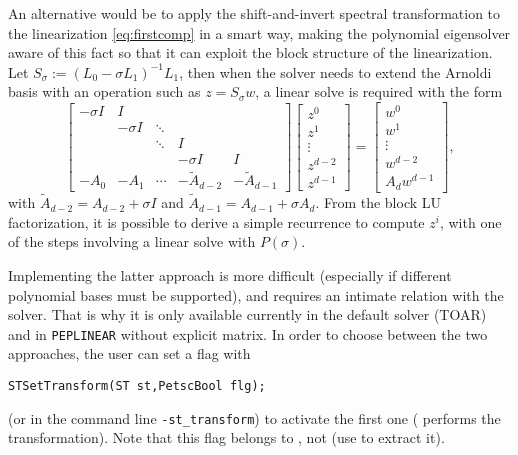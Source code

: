 An alternative would be to apply the shift-and-invert spectral transformation to the linearization \eqref{eq:firstcomp} in a smart way, making the polynomial eigensolver aware of this fact so that it can exploit the block structure of the linearization.
Let $S_\sigma:=(L_0-\sigma L_1)^{-1}L_1$, then when the solver needs to extend the Arnoldi basis with an operation such as $z=S_\sigma w$, a linear solve is required with the form
\begin{equation}
\label{eq:sinvpeplin}
\begin{bmatrix}
  -\sigma I  & I \\
  & -\sigma I & \ddots \\
  & & \ddots & I \\
  & & & -\sigma I & I \\
  -A_0 & -A_1 & \cdots  & -\tilde{A}_{d-2} & -\tilde{A}_{d-1}
\end{bmatrix}
\begin{bmatrix}
  z^0\\z^1\\\vdots\\z^{d-2}\\z^{d-1}
\end{bmatrix}
  =
\begin{bmatrix}
  w^0\\w^1\\\vdots\\w^{d-2}\\A_dw^{d-1}
\end{bmatrix},
\end{equation}
with $\tilde{A}_{d-2}=A_{d-2}+\sigma I$ and $\tilde{A}_{d-1}=A_{d-1}+\sigma A_d$.
From the block LU factorization, it is possible to derive a simple recurrence to compute $z^i$, with one of the steps involving a linear solve with $P(\sigma)$.

Implementing the latter approach is more difficult (especially if different polynomial bases must be supported), and requires an intimate relation with the  solver. That is why it is only available currently in the default solver (TOAR) and in \texttt{PEPLINEAR} without explicit matrix. In order to choose between the two approaches, the user can set a flag with
	\begin{Verbatim}[fontsize=\small]
	STSetTransform(ST st,PetscBool flg);
	\end{Verbatim}
(or in the command line \Verb!-st_transform!) to activate the first one ( performs the transformation). Note that this flag belongs to , not  (use  to extract it).

